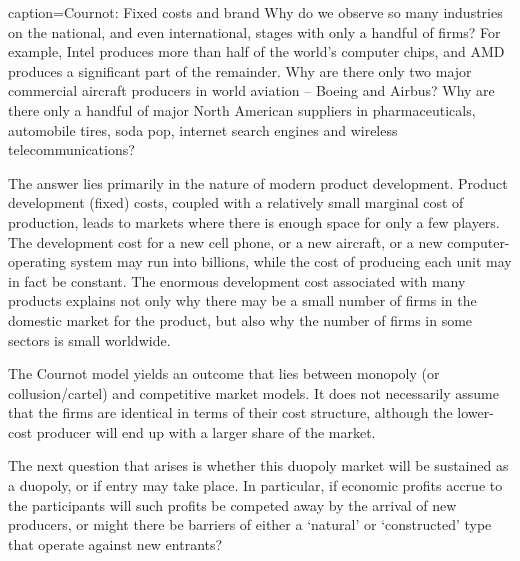 \begin{ApplicationBox}{caption={Cournot: Fixed costs and brand \label{app:cournot}}}
	Why do we observe so many industries on the national, and even international, stages with only a handful of firms? For example, Intel produces more than half of the world's computer chips, and AMD produces a significant part of the remainder. Why are there only two major commercial aircraft producers in world aviation -- Boeing and Airbus? Why are there only a handful of major North American suppliers in pharmaceuticals, automobile tires, soda pop, internet search engines and wireless telecommunications?
	
	The answer lies primarily in the nature of modern product development. Product development (fixed) costs, coupled with a relatively small marginal cost of production, leads to markets where there is enough space for only a few players. The development cost for a new cell phone, or a new aircraft, or a new computer-operating system may run into billions, while the cost of producing each unit may in fact be constant. The enormous development cost associated with many products explains not only why there may be a small number of firms in the domestic market for the product, but also why the number of firms in some sectors is small worldwide.
\end{ApplicationBox}

The Cournot model yields an outcome that lies between monopoly (or
collusion/cartel) and competitive market models. It does not necessarily
assume that the firms are identical in terms of their cost structure,
although the lower-cost producer will end up with a larger share of the market.

The next question that arises is whether this duopoly market will be
sustained as a duopoly, or if entry may take place. In particular, if
economic profits accrue to the participants will such profits be competed
away by the arrival of new producers, or might there be barriers of either a
`natural' or `constructed' type that operate against new entrants?

